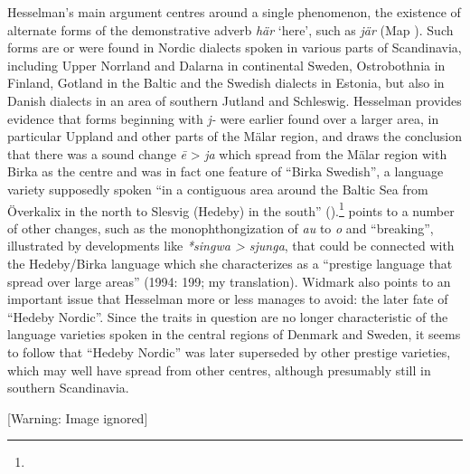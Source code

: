 \begin{styleBodytextC}
Hesselman’s main argument centres around a single phenomenon, the existence of alternate forms of the demonstrative adverb \textit{här} ‘here’, such as \textit{jär} (Map ). Such forms are or were found in Nordic dialects spoken in various parts of Scandinavia, including Upper Norrland and Dalarna in continental Sweden, Ostrobothnia in Finland, Gotland in the Baltic and the Swedish dialects in Estonia, but also in Danish dialects in an area of southern Jutland and Schleswig. Hesselman provides evidence that forms beginning with \textit{j-} were earlier found over a larger area, in particular Uppland and other parts of the Mälar region, and draws the conclusion that there was a sound change \textit{\=e }{\textgreater} \textit{ja }which spread from the Mälar region with Birka as the centre and was in fact one feature of “Birka Swedish”, a language variety supposedly spoken “in a contiguous area around the Baltic Sea from Överkalix in the north to Slesvig (Hedeby) in the south” (\citet[158]{Hesselman1936}).\footnote{} \citet{Widmark1994} points to a number of other changes,  such as the monophthongization of \textit{au} to \textit{o }and “breaking”, illustrated by developments like \textit{*singwa {\textgreater} sjunga}, that could be connected with the Hedeby/Birka language which she characterizes as a “prestige language that spread over large areas” (1994: 199; my translation). Widmark also points to an important issue that Hesselman more or less manages to avoid: the later fate of “Hedeby Nordic”. Since the traits in question are no longer characteristic of the language varieties spoken in the central regions of Denmark and Sweden, it seems to follow that “Hedeby Nordic” was later superseded by other prestige varieties, which may well have spread from other centres, although presumably still in southern Scandinavia. 

\end{styleBodytextC}

  [Warning: Image ignored] %
 

\begin{stylecaption}

\end{stylecaption}

\begin{figure}[h]

\begin{minipage}{5.8752in}

\end{minipage}

\end{figure}

